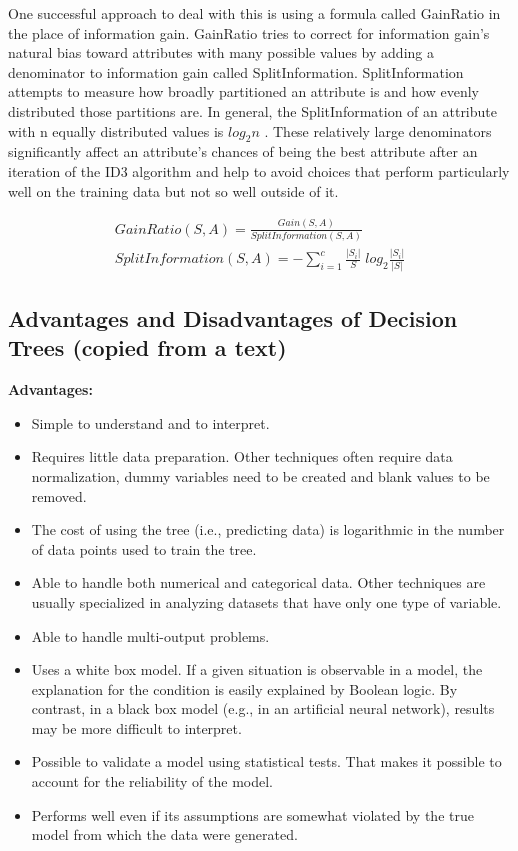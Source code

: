 \documentclass[12pt]{report}
\begin{document}
One successful approach to deal with this is using a formula called GainRatio in the place of information gain. GainRatio tries to correct for information gain’s natural bias toward attributes with many possible values by adding a denominator to information gain called SplitInformation. SplitInformation attempts to measure how broadly partitioned an attribute is and how evenly distributed those partitions are. In general, the SplitInformation of an attribute with n equally ­distributed values is $log_2 n$ . These relatively large denominators significantly affect an attribute’s chances of being the best attribute after an iteration of the ID3 algorithm and help to avoid choices that perform particularly well on the training data but not so well outside of it.

\begin{gather*}
	GainRatio(S,A)  = \frac{Gain(S,A)}{SplitInformation(S,A)} \\
	SplitInformation(S,A) = - \sum_{i=1}^c \frac{|S_i|}{S} \; log_2\frac{|S_i|}{|S|}
\end{gather*}


\subsection{Advantages and Disadvantages of Decision Trees (copied from a text)}
\textbf{Advantages:}

\begin{itemize}
\item Simple to understand and to interpret.
\item Requires little data preparation. Other techniques often require data normalization, dummy variables need to be created and blank values to be removed.
\item The cost of using the tree (i.e., predicting data) is logarithmic in the number of data points used to train the tree.
\item Able to handle both numerical and categorical data. Other techniques are usually specialized in analyzing datasets that have only one type of variable.
\item Able to handle multi-output problems.
\item Uses a white box model. If a given situation is observable in a model, the explanation for the condition is easily explained by Boolean logic. By contrast, in a black box model (e.g., in an artificial neural network), results may be more difficult to interpret.
\item Possible to validate a model using statistical tests. That makes it possible to account for the reliability of the model.
\item Performs well even if its assumptions are somewhat violated by the true model from which the data were generated.
\end{itemize}
\end{document}
